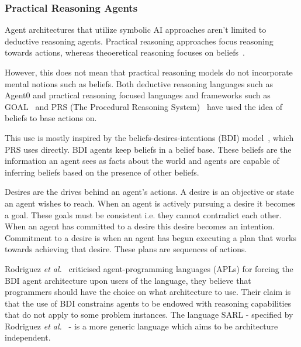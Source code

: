 \documentclass[]{final_report}
\begin{document}
\subsubsection{Practical Reasoning Agents}
Agent architectures that utilize symbolic AI approaches aren't limited to deductive reasoning agents. Practical reasoning approaches focus reasoning towards actions, whereas theoeretical reasoning focuses on beliefs~\cite{wooldridge2009introduction}.\par 
However, this does not mean that practical reasoning models do not incorporate mental notions such as beliefs. Both deductive reasoning languages such as Agent0 and practical reasoning focused languages and frameworks such as GOAL~\cite{hindriks2000agent} and PRS (The Procedural Reasoning System)~\cite{georgeff1987reactive} have used the idea of beliefs to base actions on.\par 
This use is mostly inspired by the beliefs-desires-intentions (BDI) model~\cite{bratman1987intention}, which PRS uses directly. BDI agents keep beliefs in a belief base. These beliefs are the information an agent sees as facts about the world and agents are capable of inferring beliefs based on the presence of other beliefs.\par 
Desires are the drives behind an agent's actions. A desire is an objective or state an agent wishes to reach. When an agent is actively pursuing a desire it becomes a goal. These goals must be consistent i.e. they cannot contradict each other. When an agent has committed to a desire this desire becomes an intention. Commitment to a desire is when an agent has begun executing a plan that works towards achieving that desire. These plans are sequences of actions.\par 
Rodriguez \textit{et al.}~\cite{rodriguez2014sarl} criticised agent-programming languages (APLs) for forcing the BDI agent architecture upon users of the language, they believe that programmers should have the choice on what architecture to use. Their claim is that the use of BDI constrains agents to be endowed with reasoning capabilities that do not apply to some problem instances. The language SARL - specified by Rodriguez \textit{et al.}~\cite{rodriguez2014sarl} - is a more generic language which aims to be architecture independent. 
\end{document}
